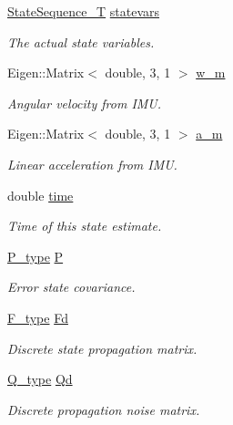 \begin{DoxyCompactItemize}
\item 
\hyperlink{structmsf__core_1_1GenericState__T_a75fe70f7c7517dbf7d4c91b75b08a1dd}{State\-Sequence\-\_\-\-T} \hyperlink{structmsf__core_1_1GenericState__T_acb07cfa8c01da7ea7527ebd78710f00a}{statevars}
\begin{DoxyCompactList}\small\item\em The actual state variables. \end{DoxyCompactList}\item 
Eigen\-::\-Matrix$<$ double, 3, 1 $>$ \hyperlink{structmsf__core_1_1GenericState__T_aa92f776680b8f2614d8069e0639e8864}{w\-\_\-m}
\begin{DoxyCompactList}\small\item\em Angular velocity from I\-M\-U. \end{DoxyCompactList}\item 
Eigen\-::\-Matrix$<$ double, 3, 1 $>$ \hyperlink{structmsf__core_1_1GenericState__T_af0fa8d13ba3aa3ff0253d85bb79d6a48}{a\-\_\-m}
\begin{DoxyCompactList}\small\item\em Linear acceleration from I\-M\-U. \end{DoxyCompactList}\item 
double \hyperlink{structmsf__core_1_1GenericState__T_aff998e4562be4645e60dfdb668870119}{time}
\begin{DoxyCompactList}\small\item\em Time of this state estimate. \end{DoxyCompactList}\item 
\hyperlink{structmsf__core_1_1GenericState__T_ab6d971027f43219a480e910392b665c8}{P\-\_\-type} \hyperlink{structmsf__core_1_1GenericState__T_adbfa25972a10054e2c310e5c74883427}{P}
\begin{DoxyCompactList}\small\item\em Error state covariance. \end{DoxyCompactList}\item 
\hyperlink{structmsf__core_1_1GenericState__T_a9b665561d9157530cc72dab33ed0344f}{F\-\_\-type} \hyperlink{structmsf__core_1_1GenericState__T_ad280aac57eb229c02d49172645159b60}{Fd}
\begin{DoxyCompactList}\small\item\em Discrete state propagation matrix. \end{DoxyCompactList}\item 
\hyperlink{structmsf__core_1_1GenericState__T_a2bd29a1ae1d6a6115a4dda70e285dc28}{Q\-\_\-type} \hyperlink{structmsf__core_1_1GenericState__T_a68fa9e618784839b121ebbf2bbb42040}{Qd}
\begin{DoxyCompactList}\small\item\em Discrete propagation noise matrix. \end{DoxyCompactList}\end{DoxyCompactItemize}
